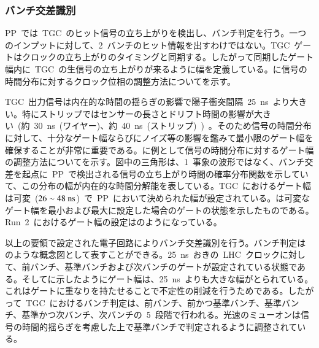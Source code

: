 \subsubsection{バンチ交差識別}\label{subsubsec:bcid}
PP~では~TGC~のヒット信号の立ち上がりを検出し、バンチ判定を行う。一つのインプットに対して、2~バンチのヒット情報を出すわけではない。TGC~ゲートはクロックの立ち上がりのタイミングと同期する。したがって同期したゲート幅内に~TGC~の生信号の立ち上がりが来るように幅を定義している。に信号の時間分布に対するクロック位相の調整方法についてを示す。

TGC~出力信号は内在的な時間の揺らぎの影響で陽子衝突間隔~25~ns~より大きい。特にストリップではセンサーの長さとドリフト時間の影響が大きい~(約~30~ns~(ワイヤー)、約~40~ns~(ストリップ)~)~。そのため信号の時間分布に対して、十分なゲート幅ならびにノイズ等の影響を鑑みて最小限のゲート幅を確保することが非常に重要である。に例として信号の時間分布に対するゲート幅の調整方法についてを示す。図中の三角形は、1~事象の波形ではなく、バンチ交差を起点に~PP~で検出される信号の立ち上がり時間の確率分布関数を示していて、この分布の幅が内在的な時間分解能を表している。TGC~におけるゲート幅は可変~($\rm{26\sim48~ns}$)~で~PP~において決められた幅が設定されている。は可変なゲート幅を最小および最大に設定した場合のゲートの状態を示したものである。Run~2~におけるゲート幅の設定はのようになっている。

以上の要領で設定された電子回路によりバンチ交差識別を行う。バンチ判定はのような概念図として表すことができる。25~ns~おきの~LHC~クロックに対して、前バンチ、基準バンチおよび次バンチのゲートが設定されている状態である。そしてに示したようにゲート幅は、25~ns~よりも大きな幅がとられている。これはゲートに重なりを持たせることで不定性の削減を行うためである。したがって~TGC~におけるバンチ判定は、前バンチ、前かつ基準バンチ、基準バンチ、基準かつ次バンチ、次バンチの~5~段階で行われる。光速のミューオンは信号の時間的揺らぎを考慮した上で基準バンチで判定されるように調整されている。

